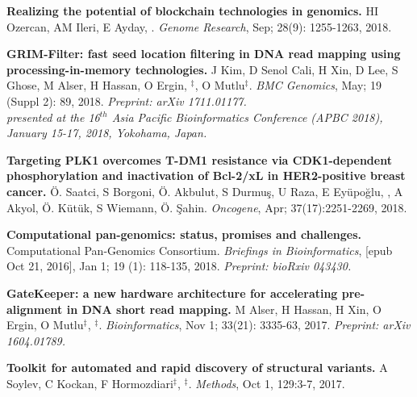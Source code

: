          {\bf Realizing the potential of blockchain technologies in genomics.}
         HI Ozercan, AM Ileri, E Ayday, \calkan{}.
         {\em Genome Research}, Sep; 28(9): 1255-1263, 2018.

          \vspace{-.2cm}

         {\bf GRIM-Filter: fast seed location filtering in DNA read mapping using processing-in-memory technologies.}
         J Kim, D Senol Cali, H Xin, D Lee, S Ghose, M Alser, H Hassan, O Ergin, \calkan{}$^\ddag$, O Mutlu$^\ddag$.
         {\em BMC Genomics}, May; 19 (Suppl 2): 89, 2018. \textit{Preprint: arXiv 1711.01177.}\\
         \hspace*{1cm}
          {\footnotesize \em presented at the 16$^{th}$ Asia Pacific Bioinformatics Conference (APBC 2018), January 15-17, 2018, Yokohama, Japan.}

         \vspace{-.2cm}        

         {\bf Targeting PLK1 overcomes T-DM1 resistance via CDK1-dependent phosphorylation and inactivation of Bcl-2/xL in HER2-positive breast cancer.}
         Ö. Saatci, S Borgoni, Ö. Akbulut, S Durmuş, U Raza, E Eyüpoğlu, \calkan{}, A Akyol, Ö. Kütük, S Wiemann, Ö. Şahin.         
         {\em Oncogene}, Apr; 37(17):2251-2269, 2018.

         

         \vspace{-.2cm}        

         {\bf Computational pan-genomics: status, promises and challenges.}
         Computational Pan-Genomics Consortium. {\em Briefings in Bioinformatics}, [epub Oct 21, 2016], Jan 1; 19 (1): 118-135, 2018.
         \textit{Preprint: bioRxiv 043430.}
         
         
         \vspace{-.2cm}
         
         {\bf GateKeeper: a new hardware architecture for accelerating pre-alignment in DNA short read mapping.}
         M Alser, H Hassan, H Xin, O Ergin, O Mutlu$^\ddag$, \calkan{}$^\ddag$.
         {\em Bioinformatics}, Nov 1; 33(21): 3335-63, 2017. \textit{Preprint: arXiv 1604.01789.}

         \vspace{-.2cm}
         {\bf Toolkit for automated and rapid discovery of structural variants.}
          A Soylev, C Kockan, F Hormozdiari$^\ddag$, \calkan{}$^\ddag$.
          {\em Methods}, Oct 1, 129:3-7, 2017.
                                       


